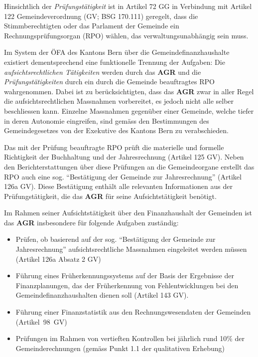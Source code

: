 \documentclass[10pt]{article}
\begin{document}
Hinsichtlich der \textit{Prüfungstätigkeit} ist in Artikel 72 GG in Verbindung mit Artikel 122 Gemeindeverordnung (GV; BSG 170.111) geregelt, dass die Stimmberechtigten oder das Parlament der Gemeinde ein Rechnungsprüfungsorgan (RPO) wählen, das verwaltungsunabhängig sein muss.

Im System der ÖFA des Kantons Bern über die Gemeindefinanzhaushalte existiert dementsprechend eine funktionelle Trennung der Aufgaben: Die \textit{aufsichtsrechtlichen Tätigkeiten} werden durch das \textbf{AGR} und die \textit{Prüfungstätigkeiten} durch ein durch die Gemeinde beauftragtes RPO wahrgenommen. Dabei ist zu berücksichtigten, dass das \textbf{AGR} zwar in aller Regel die aufsichtsrechtlichen Massnahmen vorbereitet, es jedoch nicht alle selber beschliessen kann. Einzelne Massnahmen gegenüber einer Gemeinde, welche tiefer in deren Autonomie eingreifen, sind gemäss den Bestimmungen des Gemeindegesetzes von der Exekutive des Kantons Bern zu verabschieden.

Das mit der Prüfung beauftragte RPO prüft die materielle und formelle Richtigkeit der Buchhaltung und der Jahresrechnung (Artikel 125 GV). Neben den Berichterstattungen über diese Prüfungen an die Gemeindeorgane erstellt das RPO auch eine sog. “{}Bestätigung der Gemeinde zur Jahresrechnung”{} (Artikel 126a GV). Diese Bestätigung enthält alle relevanten Informationen aus der Prüfungstätigkeit, die das \textbf{AGR }für seine Aufsichtstätigkeit benötigt.

Im Rahmen seiner Aufsichtstätigkeit über den Finanzhaushalt der Gemeinden ist das \textbf{AGR} insbesondere für folgende Aufgaben zuständig:

\begin{itemize}
    \item Prüfen, ob basierend auf der sog. “{}Bestätigung der Gemeinde zur Jahresrechnung”{} aufsichtsrechtliche Massnahmen eingeleitet werden müssen (Artikel 126a Absatz 2 GV)

    \item Führung eines Früherkennungssystems auf der Basis der Ergebnisse der Finanzplanungen, das der Früherkennung von Fehlentwicklungen bei den Gemeindefinanzhaushalten dienen soll (Artikel 143 GV).

    \item Führung einer Finanzstatistik aus den Rechnungswesendaten der Gemeinden (Artikel~98~GV)

    \item Prüfungen im Rahmen von vertieften Kontrollen bei jährlich rund 10\% der Gemeinderechnungen (gemäss Punkt 1.1 der qualitativen Erhebung)

\end{itemize}
\end{document}
